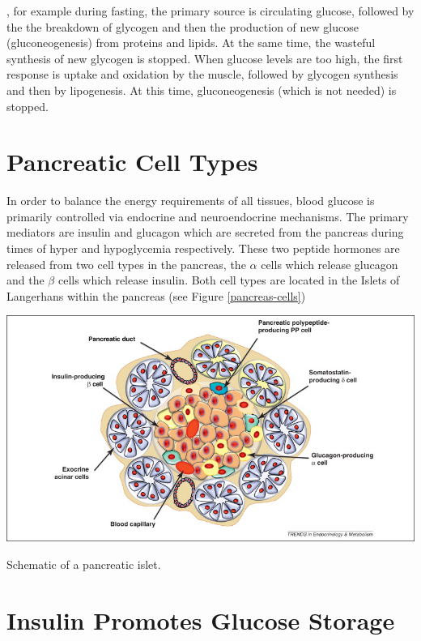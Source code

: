 \documentclass{tufte-handout}
\begin{document}
, for example during fasting, the primary source is circulating glucose, followed by the the breakdown of glycogen and then the production of new glucose (gluconeogenesis) from proteins and lipids.  At the same time, the wasteful synthesis of new glycogen is stopped.  When glucose levels are too high, the first response is uptake and oxidation by the muscle, followed by glycogen synthesis and then by lipogenesis.  At this time, gluconeogenesis (which is not needed) is stopped.

\section{Pancreatic Cell Types}

In order to balance the energy requirements of all tissues, blood glucose is primarily controlled via endocrine and neuroendocrine mechanisms.  The primary mediators are insulin and glucagon which are secreted from the pancreas during times of hyper and hypoglycemia respectively.  These two peptide hormones are released from two cell types in the pancreas, the $\alpha$ cells which release glucagon and the $\beta$ cells which release insulin.  Both cell types are located in the Islets of Langerhans within the pancreas (see Figure \ref{pancreas-cells})\cite{Efrat2012}

\begin{marginfigure}[-5in]
\includegraphics{figures/insulin-cells.png}
\caption{Schematic of a pancreatic islet.}
\label{pancreas-cells}
\end{marginfigure}

\section{Insulin Promotes Glucose Storage}
\end{document}
